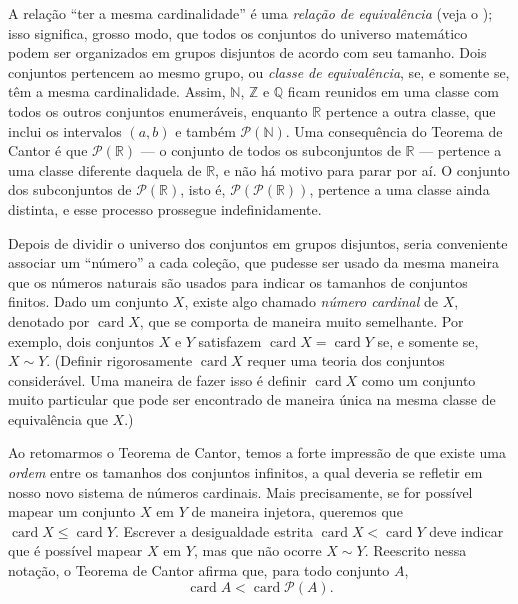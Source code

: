 A relação ``ter a mesma cardinalidade'' é uma \textit{relação de equivalência} (veja o ); isso significa, grosso modo, que todos os conjuntos do universo matemático podem ser organizados em grupos disjuntos de acordo com seu tamanho. Dois conjuntos pertencem ao mesmo grupo, ou \textit{classe de equivalência}, se, e somente se, têm a mesma cardinalidade. Assim, $\mathbb{N}$, $\mathbb{Z}$ e $\mathbb{Q}$ ficam reunidos em uma classe com todos os outros conjuntos enumeráveis, enquanto $\mathbb{R}$ pertence a outra classe, que inclui os intervalos $(a, b)$ e também $\mathcal{P}(\mathbb{N})$. Uma consequência do Teorema de Cantor é que $\mathcal{P}(\mathbb{R})$ --- o conjunto de todos os subconjuntos de $\mathbb{R}$ --- pertence a uma classe diferente daquela de $\mathbb{R}$, e não há motivo para parar por aí. O conjunto dos subconjuntos de $\mathcal{P}(\mathbb{R})$, isto é, $\mathcal{P}(\mathcal{P}(\mathbb{R}))$, pertence a uma classe ainda distinta, e esse processo prossegue indefinidamente.  

Depois de dividir o universo dos conjuntos em grupos disjuntos, seria conveniente associar um ``número'' a cada coleção, que pudesse ser usado da mesma maneira que os números naturais são usados para indicar os tamanhos de conjuntos finitos. Dado um conjunto $X$, existe algo chamado \textit{número cardinal} de $X$, denotado por $\operatorname{card} X$, que se comporta de maneira muito semelhante. Por exemplo, dois conjuntos $X$ e $Y$ satisfazem $\operatorname{card} X = \operatorname{card} Y$ se, e somente se, $X \sim Y$. (Definir rigorosamente $\operatorname{card} X$ requer uma teoria dos conjuntos considerável. Uma maneira de fazer isso é definir $\operatorname{card} X$ como um conjunto muito particular que pode ser encontrado de maneira única na mesma classe de equivalência que $X$.)  

Ao retomarmos o Teorema de Cantor, temos a forte impressão de que existe uma \textit{ordem} entre os tamanhos dos conjuntos infinitos, a qual deveria se refletir em nosso novo sistema de números cardinais. Mais precisamente, se for possível mapear um conjunto $X$ em $Y$ de maneira injetora, queremos que $\operatorname{card} X \leq \operatorname{card} Y$. Escrever a desigualdade estrita $\operatorname{card} X < \operatorname{card} Y$ deve indicar que é possível mapear $X$ em $Y$, mas que não ocorre $X \sim Y$. Reescrito nessa notação, o Teorema de Cantor afirma que, para todo conjunto $A$,  
\[
\operatorname{card} A < \operatorname{card} \mathcal{P}(A).
\]

